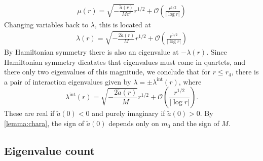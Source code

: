 \documentclass[thesis.tex]{subfiles}
\begin{document}
\begin{align*}
\mu(r) = \sqrt{-\frac{\tilde{a}(r)}{M c^2}}r^{1/2} + \mathcal{O}\left( \frac{r^{1/2}}{|\log r|} \right)
\end{align*}
Changing variables back to $\lambda$, this is located at
\begin{align*}
\lambda(r) = \sqrt{-\frac{2 \tilde{a}(r)}{M}}r^{1/2} + \mathcal{O}\left( \frac{r^{1/2}}{|\log r|} \right)
\end{align*}
By Hamiltonian symmetry there is also an eigenvalue at $-\lambda(r)$. Since Hamiltonian symmetry  dicatates that eigenvalues must come in quartets, and there only two eigenvalues of this magnitude, we conclude that for $r \leq r_4$, there is a pair of interaction eigenvalues given by $\lambda = \pm \lambda^{\text{int}}(r)$, where
\[
\lambda^{\text{int}}(r) = \sqrt{ -\frac{2 \tilde{a}(r)}{M} }r^{1/2} + \mathcal{O}\left( \frac{r^{1/2}}{|\log r|} \right).
\]
These are real if $\tilde{a}(0) < 0$ and purely imaginary if $\tilde{a}(0) > 0$. By \cref{lemma:chara}, the sign of $\tilde{a}(0)$ depends only on $m_0$ and the sign of $M$.

\subsection{Eigenvalue count}
\end{document}
